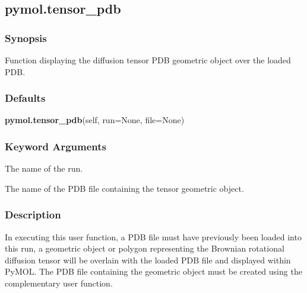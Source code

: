 

  

 \newpage 

 \subsection{pymol.tensor\_pdb} 

  
 \subsubsection{Synopsis} 

 Function displaying the diffusion tensor PDB geometric object over the loaded PDB. 
  

  
 \subsubsection{Defaults} 

 \textsf{\textbf{pymol.tensor\_pdb}(self, run=None, file=None)} 

  
 \subsubsection{Keyword Arguments} 

   The name of the run.   

   The name of the PDB file containing the tensor geometric object.  

  

  
 \subsubsection{Description} 

 In executing this user function, a PDB file must have previously been loaded into this run, a geometric object or polygon representing the Brownian rotational diffusion tensor will be overlain with the loaded PDB file and displayed within PyMOL.  The PDB file containing the geometric object must be created using the complementary  user function. 
  

